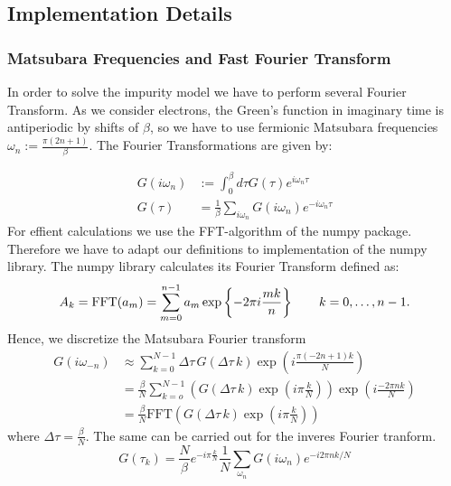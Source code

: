 \begin{appendix}
\section{Implementation Details}
\subsubsection{Matsubara Frequencies and Fast Fourier Transform}
In order to solve the impurity model we have to perform several Fourier Transform.
As we consider electrons, the Green's function in imaginary time is antiperiodic by shifts of $\beta$, so we have to use fermionic Matsubara frequencies $ω_n:=\frac{π(2n+1)}{β}$.
The Fourier Transformations are given by:

\begin{align}
  G(i ω_n) &:= \int_0^β dτ G(τ) e^{i ω_n τ}\\
  G(τ) &= \frac{1}{β} \sum_{i ω_n} G(i ω_n) e^{-i ω_n τ}
\end{align}
For effient calculations we use the FFT-algorithm of the numpy package. Therefore we have to adapt our definitions to implementation of the numpy library. The numpy library calculates its Fourier Transform defined as:
\begin{equation}
  A_k = \mathrm{FFT}(a_m) =  \sum_{m=0}^{n-1} a_m \exp\left\{-2\pi i{mk \over n}\right\}
   \qquad k = 0,\ldots,n-1.
\end{equation}
Hence, we discretize the Matsubara Fourier transform
\begin{align}
  G(i ω_{-n}) &\approx \sum_{k=0}^{N-1} \Delta τ \, G(\Delta τ \, k) \exp{\left(i \frac{π (-2n+1)k}{N}\right)}\\
          &=\frac{\beta}{N} \sum_{k=o}^{N-1} \left( G(\Delta τ \, k)\exp{\left(i π \frac{k}{N}\right)}  \right)  \exp{\left(i \frac{-2 π n k}{N}\right)}\\
          &= \frac{\beta}{N} \mathrm{FFT}\left( G(\Delta τ \, k)\exp{\left(i π \frac{k}{N}\right)}\right)
\end{align}
where $\Delta τ = \frac{\beta}{N}$.
The same can be carried out for the inveres Fourier tranform.
\begin{equation}
  G(τ_k) = \frac{N}{β} e^{-i π \frac{k}{N}}\frac{1}{N}\sum_{ω_n}G(i ω_n) e^{-i 2π n k/N}
\end{equation}

\end{appendix}

